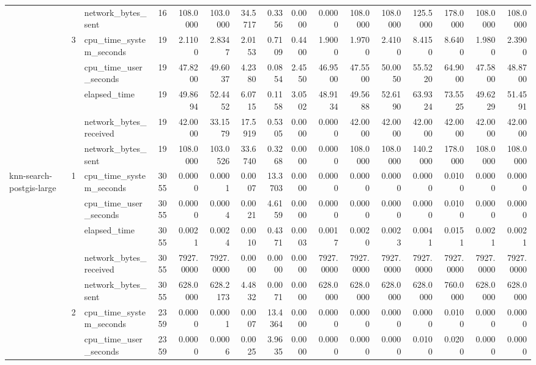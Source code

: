 \begin{tabular}{lllrrrrrrrrrrrrr}
 &  & network\_bytes\_sent & 16 & 108.0000 & 103.0000 & 34.5717 & 0.3356 & 0.0000 & 0.0000 & 108.0000 & 108.0000 & 125.5000 & 178.0000 & 108.0000 & 108.0000 \\
\cline{2-16}
 & \multirow[t]{5}{*}{3} & cpu\_time\_system\_seconds & 19 & 2.1100 & 2.8347 & 2.0153 & 0.7109 & 0.4400 & 1.9000 & 1.9700 & 2.4100 & 8.4150 & 8.6400 & 1.9800 & 2.3900 \\
 &  & cpu\_time\_user\_seconds & 19 & 47.8200 & 49.6037 & 4.2380 & 0.0854 & 2.4550 & 46.9500 & 47.5500 & 50.0050 & 55.5220 & 64.9000 & 47.5800 & 48.8700 \\
 &  & elapsed\_time & 19 & 49.8694 & 52.4452 & 6.0715 & 0.1158 & 3.0502 & 48.9134 & 49.5688 & 52.6190 & 63.9324 & 73.5525 & 49.6229 & 51.4591 \\
 &  & network\_bytes\_received & 19 & 42.0000 & 33.1579 & 17.5919 & 0.5305 & 0.0000 & 0.0000 & 42.0000 & 42.0000 & 42.0000 & 42.0000 & 42.0000 & 42.0000 \\
 &  & network\_bytes\_sent & 19 & 108.0000 & 103.0526 & 33.6740 & 0.3268 & 0.0000 & 0.0000 & 108.0000 & 108.0000 & 140.2000 & 178.0000 & 108.0000 & 108.0000 \\
\cline{1-16} \cline{2-16}
\multirow[t]{15}{*}{knn-search-postgis-large} & \multirow[t]{5}{*}{1} & cpu\_time\_system\_seconds & 3055 & 0.0000 & 0.0001 & 0.0007 & 13.3703 & 0.0000 & 0.0000 & 0.0000 & 0.0000 & 0.0000 & 0.0100 & 0.0000 & 0.0000 \\
 &  & cpu\_time\_user\_seconds & 3055 & 0.0000 & 0.0004 & 0.0021 & 4.6159 & 0.0000 & 0.0000 & 0.0000 & 0.0000 & 0.0000 & 0.0100 & 0.0000 & 0.0000 \\
 &  & elapsed\_time & 3055 & 0.0021 & 0.0024 & 0.0010 & 0.4371 & 0.0003 & 0.0017 & 0.0020 & 0.0023 & 0.0041 & 0.0151 & 0.0021 & 0.0021 \\
 &  & network\_bytes\_received & 3055 & 7927.0000 & 7927.0000 & 0.0000 & 0.0000 & 0.0000 & 7927.0000 & 7927.0000 & 7927.0000 & 7927.0000 & 7927.0000 & 7927.0000 & 7927.0000 \\
 &  & network\_bytes\_sent & 3055 & 628.0000 & 628.2173 & 4.4832 & 0.0071 & 0.0000 & 628.0000 & 628.0000 & 628.0000 & 628.0000 & 760.0000 & 628.0000 & 628.0000 \\
\cline{2-16}
 & \multirow[t]{5}{*}{2} & cpu\_time\_system\_seconds & 2359 & 0.0000 & 0.0001 & 0.0007 & 13.4364 & 0.0000 & 0.0000 & 0.0000 & 0.0000 & 0.0000 & 0.0100 & 0.0000 & 0.0000 \\
 &  & cpu\_time\_user\_seconds & 2359 & 0.0000 & 0.0006 & 0.0025 & 3.9635 & 0.0000 & 0.0000 & 0.0000 & 0.0000 & 0.0100 & 0.0200 & 0.0000 & 0.0000 \\

\end{tabular}

